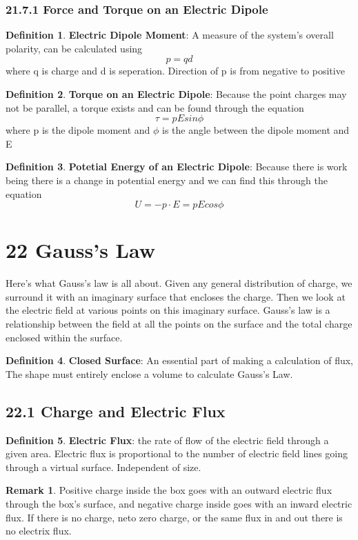 \documentclass[12pt]{amsart}
\theoremstyle{definition}
\newtheorem{definition}{Definition} %
\newtheorem*{remark}{Remark}        %
\numberwithin{equation}{theorem}    %
\begin{document}
\subsubsection*{21.7.1 Force and Torque on an Electric Dipole}

\begin{definition}
    \textbf{Electric Dipole Moment}:
    A measure of the system's overall polarity,
    can be calculated using $$p = qd$$ where q is charge and d is seperation.
    Direction of p is from negative to positive
\end{definition}

\begin{definition}
    \textbf{Torque on an Electric Dipole}:
    Because the point charges may not be
    parallel, a torque exists and can be found through the equation $$\tau = pEsin\phi$$
    where p is the dipole moment and $\phi$ is the angle between the dipole moment and E
\end{definition}

\begin{definition}
    \textbf{Potetial Energy of an Electric Dipole}:
    Because there is work being
    there is a change in potential energy and we can find this through the equation
    $$U =-p\cdot E = pEcos\phi$$ 
\end{definition}

\section*{22 Gauss's Law}
 Here’s what Gauss’s law is all about. Given any general distribution of charge,
 we surround it with an imaginary surface that encloses the charge. Then we 
 look at the electric field at various points on this imaginary surface. 
 Gauss’s law is a relationship between the field at all the points on the 
 surface and the total charge enclosed within the surface.

 \begin{definition}
    \textbf{Closed Surface}:
    An essential part of making a calculation of flux,
    The shape must entirely enclose a volume to calculate Gauss's Law.
\end{definition}


 \subsection*{22.1 Charge and Electric Flux}

\begin{definition}
    \textbf{Electric Flux}: 
    the rate of flow of the electric field through 
    a given area. Electric flux is proportional to the number of 
    electric field lines going through a virtual surface. Independent of size.

    \begin{remark}
        Positive charge inside the box goes with an outward electric flux 
        through the box’s surface, and negative charge inside goes with an 
        inward electric flux. If there is no charge, neto zero charge, or the 
        same flux in and out there is no electrix flux. 
    \end{remark}
\end{definition}
\end{document}
